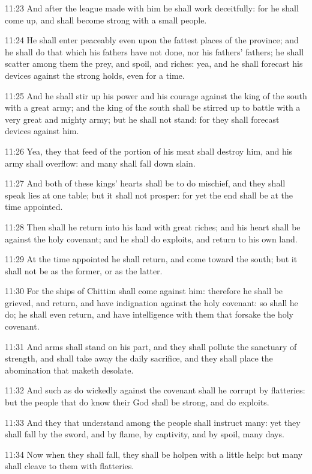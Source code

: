 11:23 And after the league made with him he shall work deceitfully: for he shall come up, and shall become strong with a small people.

11:24 He shall enter peaceably even upon the fattest places of the province; and he shall do that which his fathers have not done, nor his fathers' fathers; he shall scatter among them the prey, and spoil, and riches: yea, and he shall forecast his devices against the strong holds, even for a time.

11:25 And he shall stir up his power and his courage against the king of the south with a great army; and the king of the south shall be stirred up to battle with a very great and mighty army; but he shall not stand: for they shall forecast devices against him.

11:26 Yea, they that feed of the portion of his meat shall destroy him, and his army shall overflow: and many shall fall down slain.

11:27 And both of these kings' hearts shall be to do mischief, and they shall speak lies at one table; but it shall not prosper: for yet the end shall be at the time appointed.

11:28 Then shall he return into his land with great riches; and his heart shall be against the holy covenant; and he shall do exploits, and return to his own land.

11:29 At the time appointed he shall return, and come toward the south; but it shall not be as the former, or as the latter.

11:30 For the ships of Chittim shall come against him: therefore he shall be grieved, and return, and have indignation against the holy covenant: so shall he do; he shall even return, and have intelligence with them that forsake the holy covenant.

11:31 And arms shall stand on his part, and they shall pollute the sanctuary of strength, and shall take away the daily sacrifice, and they shall place the abomination that maketh desolate.

11:32 And such as do wickedly against the covenant shall he corrupt by flatteries: but the people that do know their God shall be strong, and do exploits.

11:33 And they that understand among the people shall instruct many: yet they shall fall by the sword, and by flame, by captivity, and by spoil, many days.

11:34 Now when they shall fall, they shall be holpen with a little help: but many shall cleave to them with flatteries.

